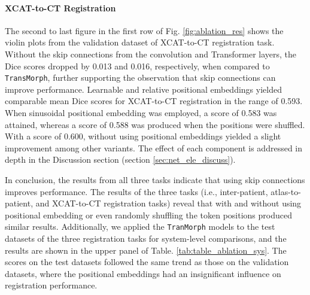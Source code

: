 \documentclass[times,twocolumn,final]{elsarticle}
\begin{document}
\paragraph{XCAT-to-CT Registration} The second to last figure in the first row of Fig. \ref{fig:ablation_res} shows the violin plots from the validation dataset of XCAT-to-CT registration task. Without the skip connections from the convolution and Transformer layers, the Dice scores dropped by 0.013 and 0.016, respectively, when compared to \texttt{TransMorph}, further supporting the observation that skip connections can improve performance. Learnable and relative positional embeddings yielded comparable mean Dice scores for XCAT-to-CT registration in the range of 0.593. When sinusoidal positional embedding was employed, a score of 0.583 was attained, whereas a score of 0.588 was produced when the positions were shuffled. With a score of 0.600, without using positional embeddings yielded a slight improvement among other variants. The effect of each component is addressed in depth in the Discussion section (section \ref{sec:net_ele_discuss}).

In conclusion, the results from all three tasks indicate that using skip connections improves performance. The results of the three tasks (i.e., inter-patient, atlas-to-patient, and XCAT-to-CT registration tasks) reveal that with and without using positional embedding or even randomly shuffling the token positions produced similar results. Additionally, we applied the \texttt{TranMorph} models to the test datasets of the three registration tasks for system-level comparisons, and the results are shown in the upper panel of Table. \ref{tab:table_ablation_sys}. The scores on the test datasets followed the same trend as those on the validation datasets, where the positional embeddings had an insignificant influence on registration performance.
\end{document}

